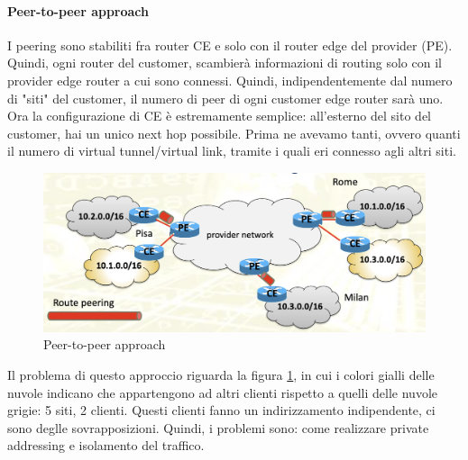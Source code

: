 \documentclass{article}
\begin{document}
\paragraph{Peer-to-peer approach} I peering sono stabiliti fra router CE e solo con il router edge del provider (PE). Quindi, ogni router del customer, scambierà informazioni di routing solo con il provider edge router a cui sono connessi. Quindi, indipendentemente dal numero di "siti" del customer, il numero di peer di ogni customer edge router sarà uno. Ora la configurazione di CE è estremamente semplice: all'esterno del sito del customer, hai un unico next hop possibile. Prima ne avevamo tanti, ovvero quanti il numero di virtual tunnel/virtual link, tramite i quali eri connesso agli altri siti. 
\begin{figure}[H]
    \centering
    \includegraphics[scale=0.5]{figures/peer-to-peer approach.png}
    \caption{Peer-to-peer approach}\label{figura:peer}
\end{figure}
Il problema di questo approccio riguarda la figura \ref{figura:peer}, in cui i colori gialli delle nuvole indicano che appartengono ad altri clienti rispetto a quelli delle nuvole grigie: 5 siti, 2 clienti. Questi clienti fanno un indirizzamento indipendente, ci sono deglle sovrapposizioni. Quindi, i problemi sono: come realizzare private addressing e isolamento del traffico. \\
\end{document}
